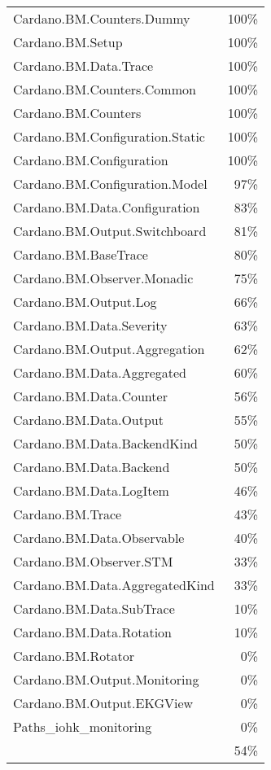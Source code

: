 \begin{tabular}{l r}
   Cardano.BM.Counters.Dummy & 100\% \\
   Cardano.BM.Setup & 100\% \\
   Cardano.BM.Data.Trace & 100\% \\
   Cardano.BM.Counters.Common & 100\% \\
   Cardano.BM.Counters & 100\% \\
   Cardano.BM.Configuration.Static & 100\% \\
   Cardano.BM.Configuration & 100\% \\
   Cardano.BM.Configuration.Model & 97\% \\
   Cardano.BM.Data.Configuration & 83\% \\
   Cardano.BM.Output.Switchboard & 81\% \\
   Cardano.BM.BaseTrace & 80\% \\
   Cardano.BM.Observer.Monadic & 75\% \\
   Cardano.BM.Output.Log & 66\% \\
   Cardano.BM.Data.Severity & 63\% \\
   Cardano.BM.Output.Aggregation & 62\% \\
   Cardano.BM.Data.Aggregated & 60\% \\
   Cardano.BM.Data.Counter & 56\% \\
   Cardano.BM.Data.Output & 55\% \\
   Cardano.BM.Data.BackendKind & 50\% \\
   Cardano.BM.Data.Backend & 50\% \\
   Cardano.BM.Data.LogItem & 46\% \\
   Cardano.BM.Trace & 43\% \\
   Cardano.BM.Data.Observable & 40\% \\
   Cardano.BM.Observer.STM & 33\% \\
   Cardano.BM.Data.AggregatedKind & 33\% \\
   Cardano.BM.Data.SubTrace & 10\% \\
   Cardano.BM.Data.Rotation & 10\% \\
   Cardano.BM.Rotator & 0\% \\
   Cardano.BM.Output.Monitoring & 0\% \\
   Cardano.BM.Output.EKGView & 0\% \\
   Paths\_iohk\_monitoring & 0\% \\
    & 54\% \\
\end{tabular}
